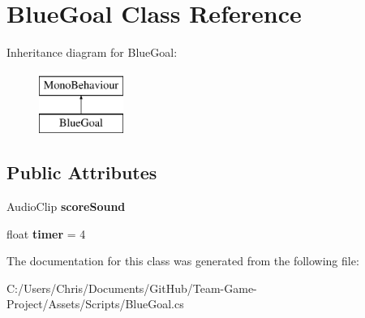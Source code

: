 \hypertarget{class_blue_goal}{}\section{Blue\+Goal Class Reference}
\label{class_blue_goal}
Inheritance diagram for Blue\+Goal\+:\begin{figure}[H]
\begin{center}
\leavevmode
\includegraphics[height=2.000000cm]{class_blue_goal}
\end{center}
\end{figure}
\subsection*{Public Attributes}
\begin{DoxyCompactItemize}
\item 
Audio\+Clip {\bfseries score\+Sound}\hypertarget{class_blue_goal_ae9e9ef106ee6cd39c0b5c48ea93bdec2}{}\label{class_blue_goal_ae9e9ef106ee6cd39c0b5c48ea93bdec2}

\item 
float {\bfseries timer} = 4\hypertarget{class_blue_goal_aad7c2e72737e98222dc72667c269a3ea}{}\label{class_blue_goal_aad7c2e72737e98222dc72667c269a3ea}

\end{DoxyCompactItemize}


The documentation for this class was generated from the following file\+:\begin{DoxyCompactItemize}
\item 
C\+:/\+Users/\+Chris/\+Documents/\+Git\+Hub/\+Team-\/\+Game-\/\+Project/\+Assets/\+Scripts/Blue\+Goal.\+cs\end{DoxyCompactItemize}
